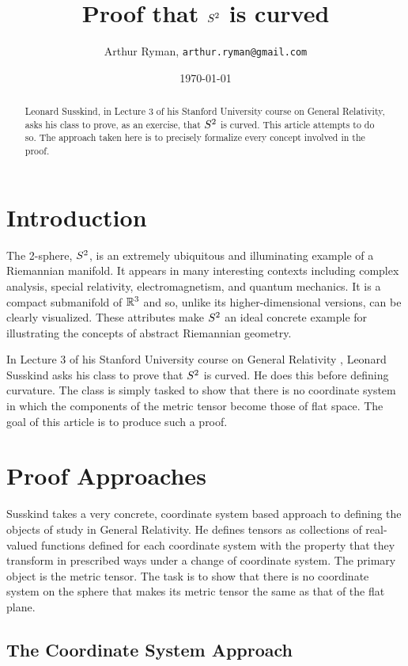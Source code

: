 \documentclass[11pt, oneside]{article}
\title{Proof that $S^2$ is curved}
\author{Arthur Ryman, {\tt arthur.ryman@gmail.com}}
\date{\today}
\begin{document}
\maketitle

\begin{abstract}
Leonard Susskind,  in Lecture 3 of his Stanford University course on General Relativity,
asks his class to prove, as an exercise, that $S^2$ is curved.
This article attempts to do so.
The approach taken here is to precisely formalize every concept involved in the proof.
\end{abstract}

\section{Introduction}

The 2-sphere, $S^2$, is an extremely ubiquitous and illuminating example of a Riemannian manifold.
It appears in many interesting contexts including complex analysis, special relativity, electromagnetism, and quantum mechanics.
It is a compact submanifold of $\mathbb{R}^3$ and so, unlike its higher-dimensional versions, can be clearly visualized.
These attributes make $S^2$ an ideal concrete example for illustrating the concepts of 
abstract Riemannian geometry.

In Lecture 3 of his Stanford University course on General Relativity \cite{susskind-gr3},
Leonard Susskind asks his class to prove that $S^2$ is curved.
He does this before defining curvature.
The class is simply tasked to show that there is no coordinate system in which the components
of the metric tensor become those of flat space.
The goal of this article is to produce such a proof.

\section{Proof Approaches}

Susskind takes a very concrete, coordinate system based approach to defining the objects of study in General Relativity.
He defines tensors as collections of real-valued functions defined for each coordinate system with the property that they
transform in prescribed ways under a change of coordinate system.
The primary object is the metric tensor.
The task is to show that there is no coordinate system on the sphere that makes its metric tensor the same as that of the flat plane.

\subsection{The Coordinate System Approach}
 
\end{document}

